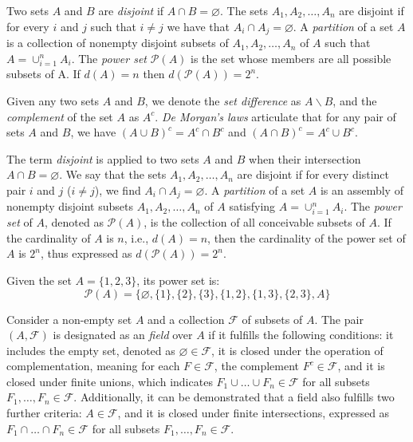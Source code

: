 Two sets $A$ and $B$ are \emph{disjoint} if $A \cap B = \varnothing$. The sets $A_1, A_2, \ldots, A_n$ are disjoint if for every $i$ and $j$ such that $i \neq j$ we have that $A_i \cap A_j = \varnothing$. A \emph{partition} of a set $A$ is a collection of nonempty disjoint subsets of $A_1, A_2, \dots, A_n$ of $A$ such that  $A = \cup_{i=1}^n A_i$. The \emph{power set} $\mathcal{P}(A)$ is the set whose members are all possible subsets of A. If $d(A)=n$ then $d\left( \mathcal{P}(A) \right) = 2^n$.

Given any two sets $A$ and $B$, we denote the \emph{set difference} as $A \backslash B$, and the \emph{complement} of the set $A$ as ${A}^c$. \emph{De Morgan's laws} articulate that for any pair of sets $A$ and $B$, we have $\left( A \cup B \right)^c = A^c \cap B^c$ and $\left( A \cap B \right)^c = A^c \cup B^c$.

The term \emph{disjoint} is applied to two sets $A$ and $B$ when their intersection $A \cap B = \varnothing$. We say that the sets $A_1, A_2, \ldots, A_n$ are disjoint if for every distinct pair $i$ and $j$ ($i \neq j$), we find $A_i \cap A_j = \varnothing$. A \emph{partition} of a set $A$ is an assembly of nonempty disjoint subsets $A_1, A_2, \dots, A_n$ of $A$ satisfying  $A = \cup_{i=1}^n A_i$. The \emph{power set} of $A$, denoted as $\mathcal{P}(A)$, is the collection of all conceivable subsets of $A$. If the cardinality of $A$ is $n$, i.e., $d(A)=n$, then the cardinality of the power set of $A$ is $2^n$, thus expressed as $d\left( \mathcal{P}(A) \right) = 2^n$.

\begin{example}
Given the set $A = \{1, 2, 3\}$, its power set is:
\[
\mathcal{P}(A) = \{\varnothing, \{1\}, \{2\}, \{3\}, \{1,2\}, \{1,3\}, \{2,3\}, A\}
\]
\end{example}

Consider a non-empty set $A$ and a collection $\mathcal{F}$ of subsets of $A$. The pair $\left( A, \mathcal{F} \right)$ is designated as an \emph{field} over $A$ if it fulfills the following conditions: it includes the empty set, denoted as $\varnothing \in \mathcal{F}$, it is closed under the operation of complementation, meaning for each $F \in \mathcal{F}$, the complement $F^c  \in \mathcal{F}$, and it is closed under finite unions, which indicates $F_1 \cup \ldots \cup F_n  \in \mathcal{F}$ for all subsets $F_1, \ldots, F_n \in \mathcal{F}$. Additionally, it can be demonstrated that a field also fulfills two further criteria: $A \in \mathcal{F}$, and it is closed under finite intersections, expressed as $F_1 \cap \ldots \cap F_n  \in \mathcal{F}$ for all subsets $F_1, \ldots, F_n \in \mathcal{F}$.

